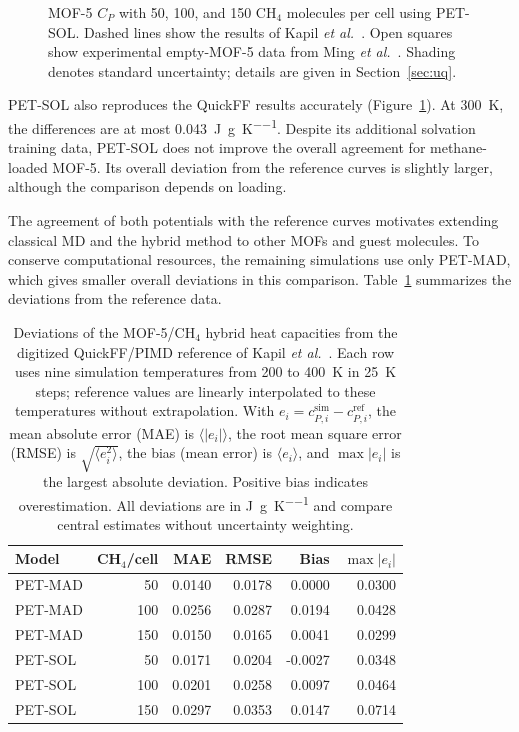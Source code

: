 \documentclass[12pt,a4paper]{article}
\numberwithin{equation}{section}
\begin{document}
\begin{figure}[htbp]
  \centering
  \caption{MOF-5 $C_P$ with 50, 100, and 150 CH$_4$ molecules per cell using PET-SOL.
  Dashed lines show the results of Kapil \emph{et al.}~\cite{kapil2019}.
  Open squares show experimental empty-MOF-5 data from
  Ming \emph{et al.}~\cite{ming2014mof5}. Shading denotes standard uncertainty; details are given in
  Section~\ref{sec:uq}.}
  \label{fig:results-cp-sol}
\end{figure}

PET-SOL also reproduces the QuickFF results accurately
(Figure~\ref{fig:results-cp-sol}). At \SI{300}{K}, the differences are
at most \SI{0.043}{J\per g\per K}. Despite its additional solvation training data, PET-SOL does not improve
the overall agreement for methane-loaded MOF-5. Its overall deviation
from the reference curves is slightly larger, although the comparison
depends on loading.

The agreement of both potentials with the reference curves motivates extending
classical MD and the hybrid method to other MOFs and guest molecules.
To conserve computational resources, the remaining simulations use only
PET-MAD, which gives smaller overall deviations in this comparison.
Table~\ref{tab:mof5-ch4-reference-comparison} summarizes the deviations
from the reference data.

\begin{table}[htbp]
  \centering
  \begin{tabular}{@{}lrrrrr@{}}
    \toprule
    Model & CH$_4$/cell & MAE & RMSE & Bias & $\max|e_i|$ \\
    \midrule
    PET-MAD & 50  & 0.0140 & 0.0178 &  0.0000 & 0.0300 \\
    PET-MAD & 100 & 0.0256 & 0.0287 &  0.0194 & 0.0428 \\
    PET-MAD & 150 & 0.0150 & 0.0165 &  0.0041 & 0.0299 \\
    \midrule
    PET-SOL & 50  & 0.0171 & 0.0204 & -0.0027 & 0.0348 \\
    PET-SOL & 100 & 0.0201 & 0.0258 &  0.0097 & 0.0464 \\
    PET-SOL & 150 & 0.0297 & 0.0353 &  0.0147 & 0.0714 \\
    \bottomrule
  \end{tabular}
  \caption{Deviations of the MOF-5/CH$_4$ hybrid heat capacities from the
  digitized QuickFF/PIMD reference of Kapil \emph{et al.}~\cite{kapil2019}.
  Each row uses nine simulation temperatures from 200 to \SI{400}{K}
  in \SI{25}{K} steps; reference values are linearly interpolated to these
  temperatures without extrapolation. With $e_i=c_{P,i}^{\mathrm{sim}}
  -c_{P,i}^{\mathrm{ref}}$, the mean absolute error (MAE) is
  $\langle|e_i|\rangle$, the root mean square error (RMSE) is
  $\sqrt{\langle e_i^2\rangle}$, the bias (mean error) is $\langle e_i\rangle$, and
  $\max|e_i|$ is the largest absolute deviation. Positive bias indicates
  overestimation. All deviations are in \si{J\per g\per K} and compare
  central estimates without uncertainty weighting.}
  \label{tab:mof5-ch4-reference-comparison}
\end{table}
\end{document}
